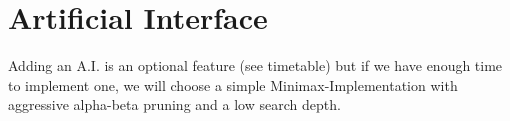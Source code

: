 \part{Artificial Interface} %
Adding an A.I. is an optional feature (see timetable) but if we have enough time to implement one,
we will choose a simple Minimax-Implementation with aggressive alpha-beta pruning and a low search depth.
